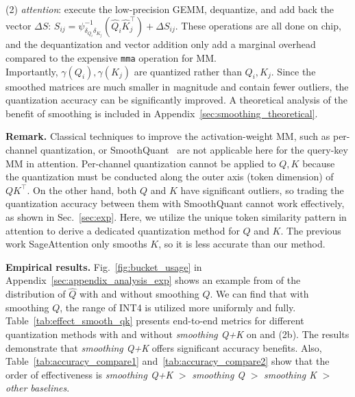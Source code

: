 (2) \emph{attention}: execute the low-precision GEMM, dequantize, and add back the vector $\Delta S$: $S_{ij} = \psi^{-1}_{\delta_{Q_i}\delta_{K_j}}(\hat Q_i \hat K_j^\top) + \Delta S_{ij}$. These operations are all done on chip, and the dequantization and vector addition only add a marginal overhead compared to the expensive \texttt{mma} operation for MM. \\
Importantly, $\gamma(Q_i), \gamma(K_j)$ are quantized rather than $Q_i, K_j$. Since the smoothed matrices are much smaller in magnitude and contain fewer outliers, the quantization accuracy can be significantly improved. A theoretical analysis of the benefit of smoothing is included in Appendix~\ref{sec:smoothing_theoretical}.




\textbf{Remark.} Classical techniques to improve the activation-weight MM, such as per-channel quantization, or SmoothQuant~\cite{xiao2023smoothquant} are not applicable here for the query-key MM in attention. Per-channel quantization cannot be applied to $Q, K$ because the quantization must be conducted along the outer axis (token dimension) of $QK^\top$. On the other hand, both $Q$ and $K$ have significant outliers, so trading the quantization accuracy between them with SmoothQuant cannot work effectively, as shown in Sec.~\ref{sec:exp}. Here, we utilize the unique token similarity pattern in attention to derive a dedicated quantization method for $Q$ and $K$. The previous work SageAttention only smooths $K$, so it is less accurate than our method.


\textbf{Empirical results.}
Fig.~\ref{fig:bucket_usage} in Appendix~\ref{sec:appendix_analysis_exp} shows an example from \cogvideo of the distribution of $\hat Q$ with and without smoothing $Q$. We can find that with smoothing $Q$, the range of INT4 is utilized more uniformly and fully.
Table~\ref{tab:effect_smooth_qk} presents end-to-end metrics for different quantization methods with and without \textit{smoothing Q+K} on \llamal and \cogvideo(2b). The results demonstrate that \textit{smoothing Q+K} offers significant accuracy benefits. Also, Table~\ref{tab:accuracy_compare1} and~\ref{tab:accuracy_compare2} show that the order of effectiveness is \textit{smoothing Q+K} $>$ \textit{smoothing Q} $>$ \textit{smoothing K} $>$ \textit{other baselines}.







